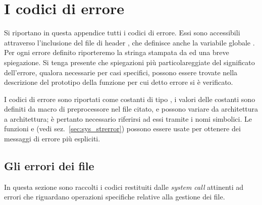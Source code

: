 
\chapter{I codici di errore}
\label{cha:errors}

Si riportano in questa appendice tutti i codici di errore. Essi sono
accessibili attraverso l'inclusione del file di header , che
definisce anche la variabile globale . Per ogni errore definito
riporteremo la stringa stampata da  ed una breve spiegazione. Si
tenga presente che spiegazioni più particolareggiate del significato
dell'errore, qualora necessarie per casi specifici, possono essere trovate
nella descrizione del prototipo della funzione per cui detto errore si è
verificato.

I codici di errore sono riportati come costanti di tipo , i valori
delle costanti sono definiti da macro di preprocessore nel file citato, e
possono variare da architettura a architettura; è pertanto necessario
riferirsi ad essi tramite i nomi simbolici. Le funzioni  e
 (vedi sez.~\ref{sec:sys_strerror}) possono essere usate per
ottenere dei messaggi di errore più espliciti.


\section{Gli errori dei file}
\label{sec:err_file_errors}

In questa sezione sono raccolti i codici restituiti dalle \textit{system call}
attinenti ad errori che riguardano operazioni specifiche relative alla
gestione dei file.

